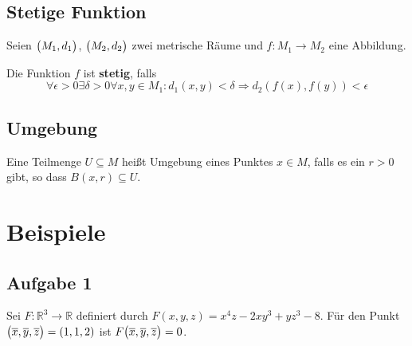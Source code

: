 \documentclass{scrreprt}
\begin{document}
\section{Stetige Funktion}
\label{sec:stetige_funktion}

Seien $\qty\big(M_1, d_1)$, $\qty\big(M_2, d_2)$ zwei metrische Räume und $f \colon M_1 \to M_2$ eine Abbildung.

Die Funktion $f$ ist \textbf{stetig}, falls
\[
  \forall \epsilon > 0 \exists \delta > 0
  \forall x, y \in M_1 \colon
  d_1(x, y) < \delta \Rightarrow d_2(f(x), f(y)) < \epsilon
\]

\section{Umgebung}
\label{sec:umgebung}

Eine Teilmenge $U \subseteq M$ heißt Umgebung eines Punktes $x \in M$,
falls es ein $r > 0$ gibt, so dass
$\hyperref[sec:offene_kugel]{B(x, r)} \subseteq U$.

\chapter{Beispiele}

\section{Aufgabe 1}

Sei $F \colon \mathbb{R}^3 \to \mathbb{R}$ definiert durch
$F(x, y, z) = x^4z - 2xy^3 + yz^3 - 8$.
Für den Punkt $\qty\big(\overline{x}, \overline{y}, \overline{z})
= (1, 1, 2)$ ist $F\qty\big(\overline{x}, \overline{y}, \overline{z}) = 0$.
\end{document}
